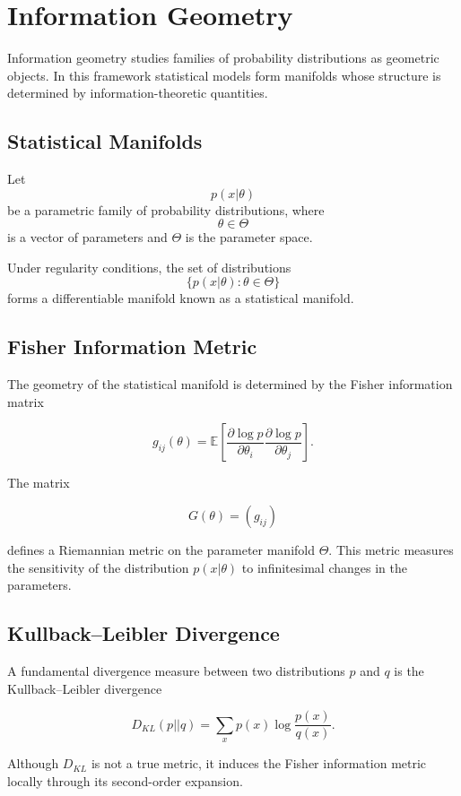 \documentclass[12pt]{article}
\begin{document}
\section{Information Geometry}

Information geometry studies families of probability distributions as geometric objects. In this framework statistical models form manifolds whose structure is determined by information-theoretic quantities.

\subsection{Statistical Manifolds}

Let
\[
p(x|\theta)
\]
be a parametric family of probability distributions, where
\[
\theta \in \Theta
\]
is a vector of parameters and $\Theta$ is the parameter space.

Under regularity conditions, the set of distributions
\[
\{p(x|\theta) : \theta \in \Theta\}
\]
forms a differentiable manifold known as a statistical manifold.

\subsection{Fisher Information Metric}

The geometry of the statistical manifold is determined by the Fisher information matrix

\[
g_{ij}(\theta) =
\mathbb{E}
\left[
\frac{\partial \log p}{\partial \theta_i}
\frac{\partial \log p}{\partial \theta_j}
\right].
\]

The matrix

\[
G(\theta) = (g_{ij})
\]

defines a Riemannian metric on the parameter manifold $\Theta$. This metric measures the sensitivity of the distribution $p(x|\theta)$ to infinitesimal changes in the parameters.

\subsection{Kullback--Leibler Divergence}

A fundamental divergence measure between two distributions $p$ and $q$ is the Kullback--Leibler divergence

\[
D_{KL}(p||q)
=
\sum_x p(x)\log \frac{p(x)}{q(x)}.
\]

Although $D_{KL}$ is not a true metric, it induces the Fisher information metric locally through its second-order expansion.
\end{document}
